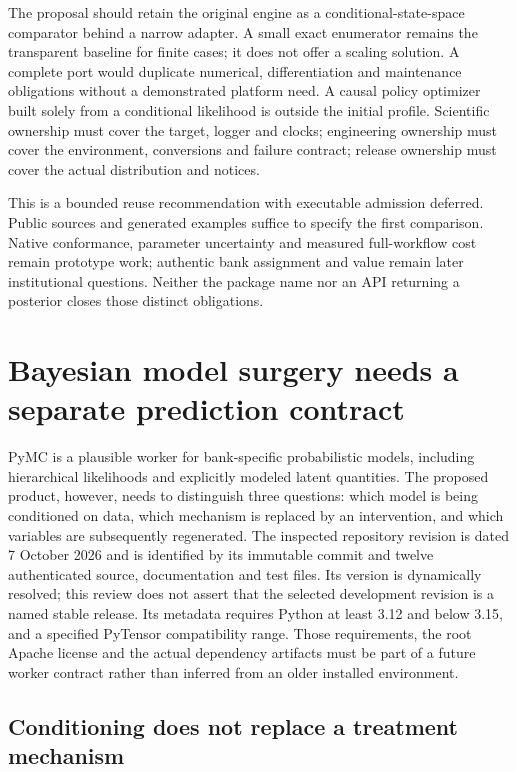 The proposal should retain the original engine as a conditional-state-space
comparator behind a narrow adapter. A small exact enumerator remains the
transparent baseline for finite cases; it does not offer a scaling solution.
A complete port would duplicate numerical, differentiation and maintenance
obligations without a demonstrated platform need. A causal policy optimizer
built solely from a conditional likelihood is outside the initial profile.
Scientific ownership must cover the target, logger and clocks; engineering
ownership must cover the environment, conversions and failure contract; release
ownership must cover the actual distribution and notices.

This is a bounded reuse recommendation with executable admission deferred.
Public sources and generated examples suffice to specify the first comparison.
Native conformance, parameter uncertainty and measured full-workflow cost remain
prototype work; authentic bank assignment and value remain later institutional
questions. Neither the package name nor an API returning a posterior closes
those distinct obligations.


\section{Bayesian model surgery needs a separate prediction contract}
\label{exec23:pymc-scope}

PyMC is a plausible worker for bank-specific probabilistic models, including
hierarchical likelihoods and explicitly modeled latent quantities. The proposed
product, however, needs to distinguish three questions: which model is being
conditioned on data, which mechanism is replaced by an intervention, and which
variables are subsequently regenerated. The inspected repository revision is
dated 7 October 2026 and is identified by its immutable commit and twelve
authenticated source, documentation and test files. Its version is dynamically
resolved; this review does not assert that the selected development revision is
a named stable release. Its metadata requires Python at least 3.12 and below
3.15, and a specified PyTensor compatibility range. Those requirements, the
root Apache license and the actual dependency artifacts must be part of a
future worker contract rather than inferred from an older installed environment.
\citep{exec23_pymc_sources}

\subsection{Conditioning does not replace a treatment mechanism}
\label{exec23:pymc-intervention}

